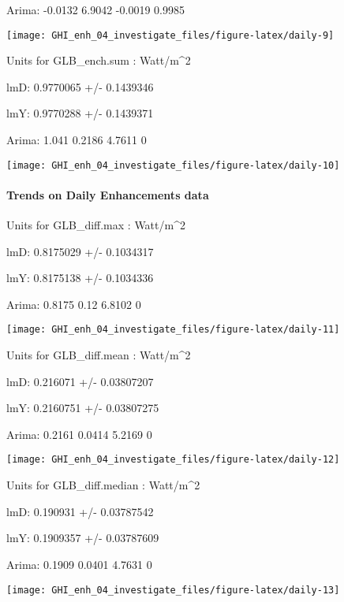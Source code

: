 \documentclass[
  10pt,
  a4paper,oneside]{article}
\begin{document}
Arima: -0.0132 6.9042 -0.0019 0.9985

\begin{center}\texttt{[image: GHI\_enh\_04\_investigate\_files/figure-latex/daily-9]} \end{center}

Units for GLB\_ench.sum : Watt/m\^{}2

lmD: 0.9770065 +/- 0.1439346

lmY: 0.9770288 +/- 0.1439371

Arima: 1.041 0.2186 4.7611 0

\begin{center}\texttt{[image: GHI\_enh\_04\_investigate\_files/figure-latex/daily-10]} \end{center}

\newpage

\hypertarget{trends-on-daily-enhancements-data}{%
\paragraph{Trends on Daily Enhancements data}\label{trends-on-daily-enhancements-data}}

Units for GLB\_diff.max : Watt/m\^{}2

lmD: 0.8175029 +/- 0.1034317

lmY: 0.8175138 +/- 0.1034336

Arima: 0.8175 0.12 6.8102 0

\begin{center}\texttt{[image: GHI\_enh\_04\_investigate\_files/figure-latex/daily-11]} \end{center}

Units for GLB\_diff.mean : Watt/m\^{}2

lmD: 0.216071 +/- 0.03807207

lmY: 0.2160751 +/- 0.03807275

Arima: 0.2161 0.0414 5.2169 0

\begin{center}\texttt{[image: GHI\_enh\_04\_investigate\_files/figure-latex/daily-12]} \end{center}

Units for GLB\_diff.median : Watt/m\^{}2

lmD: 0.190931 +/- 0.03787542

lmY: 0.1909357 +/- 0.03787609

Arima: 0.1909 0.0401 4.7631 0

\begin{center}\texttt{[image: GHI\_enh\_04\_investigate\_files/figure-latex/daily-13]} \end{center}
\end{document}
